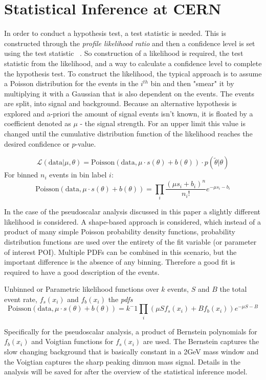 \section{Statistical Inference at CERN}
In order to conduct a hypothesis test, a test statistic is needed. This is constructed through the \textit{profile likelihood ratio} and then a confidence level is set using the test statistic ~\cite{Cowan_2011}.
So construction of a likelihood is required, the test statistic from the likelihood, and a way to calculate a confidence level to complete the hypothesis test.
To construct the likelihood, the typical approach is to assume a Poisson distribution for the events in the $i^{th}$ bin and then "smear" it by multiplying it with a Gaussian that is also dependent on the events. The events are split, into signal and background. Because an alternative hypothesis is explored and a-priori the amount of signal events isn't known, it is floated by a coefficient denoted as $\mu$ - the signal strength. For an upper limit this value is changed until the cumulative distribution function of the likelihood reaches the desired confidence or $p$-value.  

\[\mathcal{L}(\text{data}|\mu,\theta) = \text{Poisson}(\text{data},\mu\cdot s(\theta)+b(\theta)) \cdot p(\tilde{\theta}|\theta) \]
For binned $n_i$ events in bin label $i$:
\begin{equation}
\text{Poisson}(\text{data},\mu\cdot s(\theta)+b(\theta)) = \prod_i \frac{(\mu s_i+b_i)^n}{n_i !}e^{-\mu s_i -b_i}
\end{equation}

In the case of the pseudoscalar analysis discussed in this paper a slightly different likelihood is considered. A shape-based approach is considered, which instead of a product of many simple Poisson probability density functions, probability distribution functions are used over the entirety of the fit variable (or parameter of interest POI). Multiple PDFs can be combined in this scenario, but the important difference is the absence of any binning. Therefore a good fit is required to have a good description of the events.  

Unbinned or Parametric likelihood functions over $k$ events, $S$ and $B$ the total event rate, $f_s(x_i)$ and $f_b(x_i)$ the \textit{pdfs}
 \[\text{Poisson}(\text{data},\mu\cdot s(\theta)+b(\theta)) = k^-1 \prod_i(\mu S f_s(x_i) + B f_b(x_i))e^{-\mu S - B}\]

Specifically for the pseudoscalar analysis, a product of Bernstein polynomials for $f_b(x_i)$ and Voigtian functions for $f_s(x_i)$ are used. The Bernstein captures the slow changing background that is basically constant in a 2GeV mass window and the Voigtian captures the sharp peaking dimuon mass signal. Details in the analysis will be saved for after the overview of the statistical inference model. 

